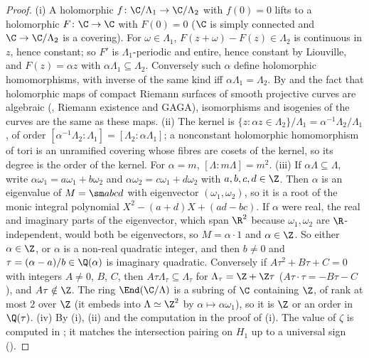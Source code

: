 \begin{proof}
(i) A holomorphic $f\colon\C/\Lambda_1\to\C/\Lambda_2$ with $f(0)=0$ lifts to a holomorphic $F\colon\C\to\C$ with $F(0)=0$ ($\C$ is simply connected and $\C\to\C/\Lambda_2$ is a covering). For
$\omega\in\Lambda_1$, $F(z+\omega)-F(z)\in\Lambda_2$ is continuous in $z$, hence constant; so $F'$ is $\Lambda_1$-periodic and entire, hence constant by Liouville, and $F(z)=\alpha z$ with
$\alpha\Lambda_1\subseteq\Lambda_2$. Conversely such $\alpha$ define holomorphic homomorphisms, with inverse of the same kind iff $\alpha\Lambda_1=\Lambda_2$. By  and the fact
that holomorphic maps of compact Riemann surfaces of smooth projective curves are algebraic (, Riemann existence and GAGA), isomorphisms and isogenies of the
curves are the same as these maps. (ii) The kernel is $\{z:\alpha z\in\Lambda_2\}/\Lambda_1=\alpha^{-1}\Lambda_2/\Lambda_1$, of order $[\alpha^{-1}\Lambda_2:\Lambda_1]=[\Lambda_2:\alpha\Lambda_1]$; a nonconstant holomorphic
homomorphism of tori is an unramified covering whose fibres are cosets of the kernel, so its degree is the order of the kernel. For $\alpha=m$, $[\Lambda:m\Lambda]=m^2$.
(iii) If $\alpha\Lambda\subseteq\Lambda$, write $\alpha\omega_1=a\omega_1+b\omega_2$ and $\alpha\omega_2=c\omega_1+d\omega_2$ with $a,b,c,d\in\Z$. Then $\alpha$ is an eigenvalue of
$M=\sm abcd$ with eigenvector $(\omega_1,\omega_2)$, so it is a root of the monic integral polynomial $X^2-(a+d)X+(ad-bc)$. If $\alpha$ were real, the real and imaginary parts of the
eigenvector, which span $\R^2$ because $\omega_1,\omega_2$ are $\R$-independent, would both be eigenvectors, so $M=\alpha\cdot1$ and $\alpha\in\Z$. So either $\alpha\in\Z$, or $\alpha$ is a non-real
quadratic integer, and then $b\ne0$ and $\tau=(\alpha-a)/b\in\Q(\alpha)$ is imaginary quadratic. Conversely if $A\tau^2+B\tau+C=0$ with integers $A\ne0$, $B$, $C$, then
$A\tau\Lambda_\tau\subseteq\Lambda_\tau$ for $\Lambda_\tau=\Z+\Z\tau$ ($A\tau\cdot\tau=-B\tau-C$), and $A\tau\notin\Z$. The ring $\End(\C/\Lambda)$ is a subring of $\C$ containing $\Z$, of rank at most $2$ over
$\Z$ (it embeds into $\Lambda\simeq\Z^2$ by $\alpha\mapsto\alpha\omega_1$), so it is $\Z$ or an order in $\Q(\tau)$. (iv) By (i), (ii) and the computation in the
proof of (i). The value of $\zeta$ is computed in \cite[Chapter VI, exercises]{SilvermanAEC}; it matches the intersection pairing on $H_1$ up to a universal sign
().
\end{proof}

